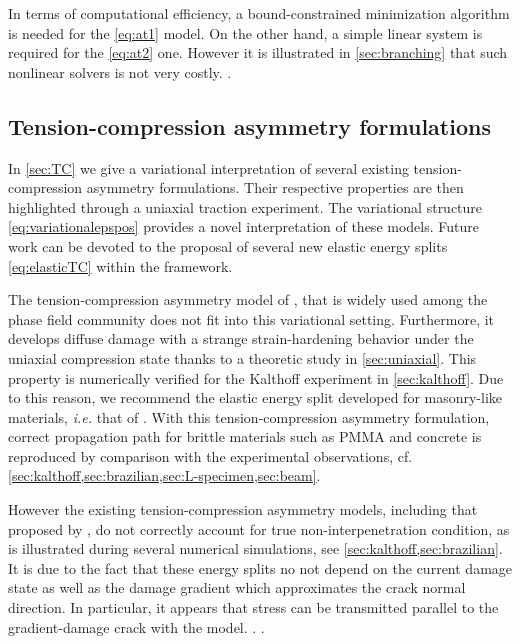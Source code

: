 In terms of computational efficiency, a bound-constrained minimization algorithm is needed for the \eqref{eq:at1} model. On the other hand, a simple linear system is required for the \eqref{eq:at2} one. However it is illustrated in \cref{sec:branching} that such nonlinear solvers is not very costly. .

\subsection{Tension-compression asymmetry formulations}
In \cref{sec:TC} we give a variational interpretation of several existing tension-compression asymmetry formulations. Their respective properties are then highlighted through a uniaxial traction experiment. The variational structure \eqref{eq:variationalepspos} provides a novel interpretation of these models. Future work can be devoted to the proposal of several new elastic energy splits \eqref{eq:elasticTC} within the framework.

The tension-compression asymmetry model of \cite{MieheHofackerWelschinger:2010}, that is widely used among the phase field community does not fit into this variational setting. Furthermore, it develops diffuse damage with a strange strain-hardening behavior under the uniaxial compression state thanks to a theoretic study in \cref{sec:uniaxial}. This property is numerically verified for the Kalthoff experiment in \cref{sec:kalthoff}. Due to this reason, we recommend the elastic energy split developed for masonry-like materials, \emph{i.e.} that of \cite{FreddiRoyer-Carfagni:2010}. With this tension-compression asymmetry formulation, correct propagation path for brittle materials such as PMMA and concrete is reproduced by comparison with the experimental observations, cf. \cref{sec:kalthoff,sec:brazilian,sec:L-specimen,sec:beam}.

However the existing tension-compression asymmetry models, including that proposed by \cite{FreddiRoyer-Carfagni:2010}, do not correctly account for true non-interpenetration condition, as is illustrated during several numerical simulations, see \cref{sec:kalthoff,sec:brazilian}. It is due to the fact that these energy splits no not depend on the current damage state as well as the damage gradient which approximates the crack normal direction. In particular, it appears that stress can be transmitted parallel to the gradient-damage crack with the \cite{FreddiRoyer-Carfagni:2010} model. . . 

